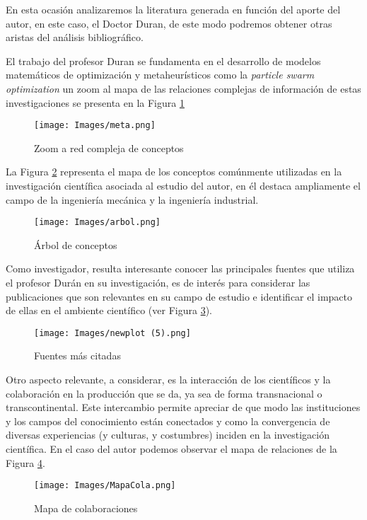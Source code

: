 \documentclass{article}
\begin{document}
En esta ocasión analizaremos la literatura generada en función del aporte del autor, en este caso, el Doctor Duran, de este modo podremos obtener otras aristas del análisis bibliográfico.

El trabajo del profesor Duran se fundamenta en el desarrollo de modelos matemáticos de optimización y metaheurísticos como la \textit{particle swarm optimization} un zoom al mapa de las relaciones complejas de información de estas investigaciones se presenta en la Figura \ref{meta}

\begin{figure}[H]
\texttt{[image: Images/meta.png]}
\centering
\caption{Zoom a red compleja de conceptos}
\label{meta}
\end{figure}

La Figura \ref{arbol} representa el mapa de los conceptos comúnmente utilizadas en la investigación científica asociada al estudio del autor, en él destaca ampliamente el campo de la ingeniería mecánica y la ingeniería industrial.

\begin{figure}[H]
\texttt{[image: Images/arbol.png]}
\centering
\caption{Árbol de conceptos}
\label{arbol}
\end{figure}

Como investigador, resulta interesante conocer las principales fuentes que utiliza el profesor Durán en su investigación, es de interés para considerar las publicaciones que son relevantes en su campo de estudio e identificar el impacto de ellas en el ambiente científico (ver Figura \ref{jo}).

\begin{figure}[H]
\texttt{[image: Images/newplot (5).png]}
\centering
\caption{Fuentes más citadas}
\label{jo}
\end{figure}

Otro aspecto relevante, a considerar, es la interacción de los científicos y la colaboración en la producción que se da, ya sea de forma transnacional o transcontinental. Este intercambio permite apreciar de que modo las instituciones y los campos del conocimiento están conectados y como la convergencia de diversas experiencias (y culturas, y costumbres) inciden en la investigación científica. En el caso del autor podemos observar el mapa de relaciones de la Figura \ref{mapa}.

\begin{figure}[H]
\texttt{[image: Images/MapaCola.png]}
\centering
\caption{Mapa de colaboraciones}
\label{mapa}
\end{figure}
\end{document}
